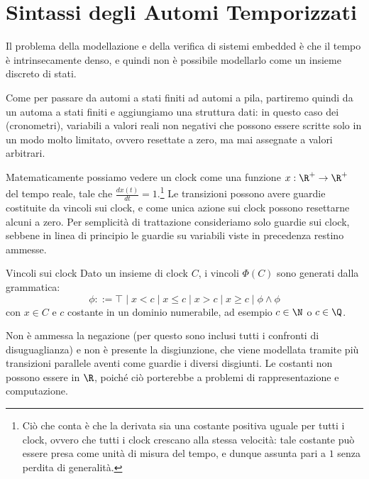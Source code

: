 \section{Sintassi degli Automi Temporizzati}

Il problema della modellazione e della verifica di sistemi embedded è che il tempo è intrinsecamente denso, e quindi non è possibile modellarlo come un insieme discreto di stati.

Come per passare da automi a stati finiti ad automi a pila, partiremo quindi da un automa a stati finiti e aggiungiamo una struttura dati: in questo caso dei  (cronometri), variabili a valori reali non negativi che possono essere scritte solo in un modo molto limitato, ovvero resettate a zero, ma mai assegnate a valori arbitrari.

Matematicamente possiamo vedere un clock come una funzione \(x: \R^+ \to \R^+\) del tempo reale, tale che \(\frac{d x(t)}{dt} = 1\).\footnote{Ciò che conta è che la derivata sia una costante positiva uguale per tutti i clock, ovvero che tutti i clock crescano alla stessa velocità: tale costante può essere presa come unità di misura del tempo, e dunque assunta pari a \(1\) senza perdita di generalità.} Le transizioni possono avere guardie costituite da vincoli sui clock, e come unica azione sui clock possono resettarne alcuni a zero. Per semplicità di trattazione consideriamo solo guardie sui clock, sebbene in linea di principio le guardie su variabili viste in precedenza restino ammesse.

\begin{definition}{Vincoli sui clock}
  Dato un insieme di clock \(C\), i vincoli \(\Phi(C)\) sono generati dalla grammatica:
  \[\phi ::= \top \mid x<c\mid x\leq c\mid x > c \mid x \geq c \mid \phi \land \phi\]
  con \(x \in C\) e \(c\) costante in un dominio numerabile, ad esempio \(c \in \N\) o \(c \in \Q\).
\end{definition}

\begin{observation}{}
  Non è ammessa la negazione (per questo sono inclusi tutti i confronti di disuguaglianza) e non è presente la disgiunzione, che viene modellata tramite più transizioni parallele aventi come guardie i diversi disgiunti. Le costanti non possono essere in \(\R\), poiché ciò porterebbe a problemi di rappresentazione e computazione.
\end{observation}

